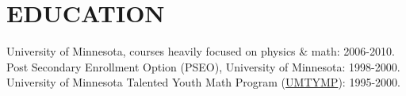 
\section{EDUCATION}
    University of Minnesota, courses heavily focused on physics \& math: 2006-2010.
    \vspace{1 mm} \\
    Post Secondary Enrollment Option (PSEO), University of Minnesota:
    1998-2000.
    \vspace{1 mm} \\
    University of Minnesota Talented Youth Math Program
    (\href{http://mathcep.umn.edu/umtymp/}{UMTYMP}):
    1995-2000.

